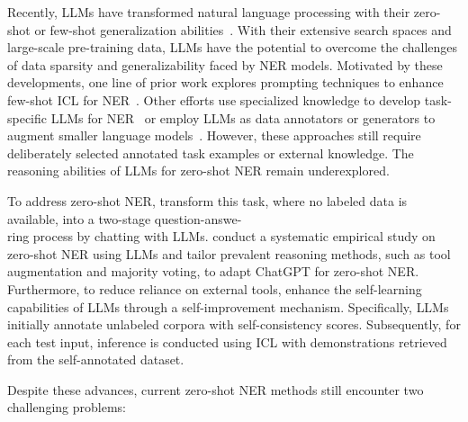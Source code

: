 Recently, \acp{LLM} have transformed natural language processing with their zero-shot or few-shot generalization abilities~\citep{meta2024introducing, openai_blog_22, chowdhery2022palm, DBLP:journals/corr/abs-2303-08774}. With their extensive search spaces and large-scale pre-training data, \acp{LLM} have the potential to overcome the challenges of data sparsity and generalizability faced by \ac{NER} models.
Motivated by these developments, one line of prior work explores  prompting techniques to enhance few-shot \ac{ICL} for \ac{NER}~\citep{wang2023gpt}. Other efforts use specialized knowledge to develop task-specific \acp{LLM} for \ac{NER}~\citep{DBLP:journals/corr/abs-2310-03668,DBLP:conf/www/ZhangZGH24,DBLP:conf/iclr/Zhou00CP24} or employ \acp{LLM} as data annotators or generators to augment smaller language models~\citep{DBLP:conf/aaai/MaWKBP024,DBLP:conf/emnlp/JosifoskiSP023}.
However, these approaches still require deliberately selected annotated task examples or external knowledge. The reasoning abilities of \acp{LLM} for zero-shot \ac{NER} remain underexplored.

To address zero-shot \ac{NER}, \citet{wei2023zero} transform this task, where no labeled data is available, into a two-stage question-answe-\\ring process by chatting with \acp{LLM}.
\citet{DBLP:conf/emnlp/XieLZZLW23} conduct a systematic empirical study on zero-shot \ac{NER} using \acp{LLM} and tailor prevalent reasoning methods, such as tool augmentation and majority voting, to adapt ChatGPT for zero-shot \ac{NER}.
Furthermore, to reduce reliance on external tools, \citet{DBLP:journals/corr/abs-2311-08921} enhance the self-learning capabilities of \acp{LLM} through a self-improvement mechanism. Specifically, \acp{LLM} initially annotate unlabeled corpora with self-consistency scores.
Subsequently, for each test input, inference is conducted using \acf{ICL} with demonstrations retrieved from the self-annotated dataset.

Despite these advances, current zero-shot \ac{NER} methods still encounter two challenging problems:

